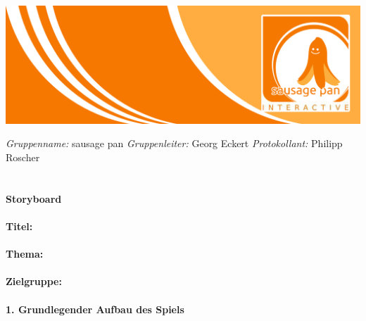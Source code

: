 \documentclass[10pt,a4paper,notitlepage]{report}
\author{Sausage Pan}
\begin{document}
	\newcommand{\Eins}[1]{\color{orange}\textbf{{\Large#1}}} %
	\newcommand{\Zwei}[1]{\color{orange}\textbf{{\large#1}}} %
	\newcommand{\Drei}[1]{\color{orange}{\normalsize#1}} %
	\newcommand{\Text}{\color{schwarz}} %
	\newcommand{\Fusszeile}
	{\textit{{\footnotesize Eckert, Georg - Roscher, Philipp - Krien, Alexandra - Sinakow, Sergej - Blasberg, Bettina - Groß, Stephanie Sara}}} %
	\marginpar{\vspace{3.0mm} \color{orange}\rule{0.8mm}{53.3mm} \\[3mm] \color{hellorange}\rule{0.8mm}{170mm}}
	\begin{center}
		\includegraphics[width=160mm]{header2}
	\end{center}
	\color{orange} \textit{Gruppenname:} \color{schwarz}sausage pan \color{orange} \textit{Gruppenleiter:} \color{schwarz}Georg Eckert   \color{orange} \textit{Protokollant:} \color{schwarz}Philipp Roscher\\
	\\
	\\
	\Eins{Storyboard}\\
	\\
	\Zwei{Titel:} \Text{Prisma}\\
	\\
	\Zwei{Thema:} \Text{Farbenlehre}\\
	\\
	\Zwei{Zielgruppe:} \Text{Schüler der fünften Klasse}\\
	\\
	\Zwei{1. Grundlegender Aufbau des Spiels}\\
	\\
	\Drei{1.1 Setting}\\
	\\
	\Text
\end{document}
